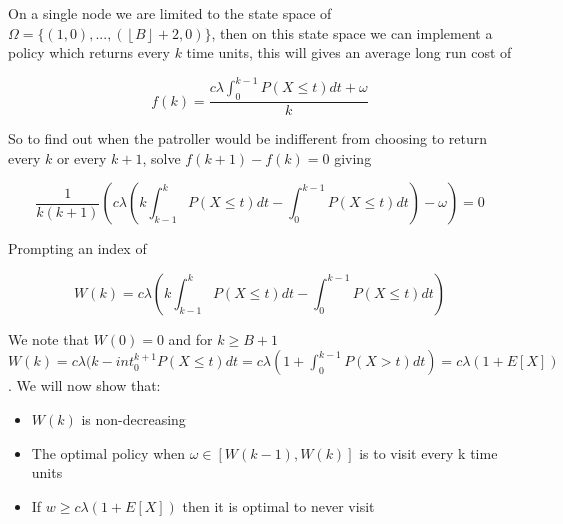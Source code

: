 \documentclass[a4paper,10pt]{article}
\newcommand{\floor}[1]{\left \lfloor #1 \right \rfloor}
\theoremstyle{definition}
\theoremstyle{definition}
\theoremstyle{remark}
\theoremstyle{definition}
\begin{document}
On a single node we are limited to the state space of $\Omega=\{ (1,0),...,(\floor{B}+2,0) \}$, then on this state space we can implement a policy which returns every $k$ time units, this will gives an average long run cost of

\begin{equation}
f(k)=\frac{c \lambda \int_{0}^{k-1} P(X \leq t) dt +\omega}{k}
\end{equation}

So to find out when the patroller would be indifferent from choosing to return every $k$ or every $k+1$, solve $f(k+1)-f(k)=0$ giving

$$\frac{1}{k(k+1)}(c \lambda (k \int_{k-1}^{k} P(X \leq t) dt - \int_{0}^{k-1} P(X \leq t) dt ) -\omega)=0 $$

Prompting an index of

$$W(k)=c \lambda (k \int_{k-1}^{k} P(X \leq t) dt - \int_{0}^{k-1} P(X \leq t) dt )$$

We note that $W(0)=0$ and for $k \geq B+1$ $W(k)=c \lambda (k - int_{0}^{k+1} P(X \leq t)dt=c \lambda (1+\int_{0}^{k-1} P(X > t)dt)=c \lambda (1+ E[X])$. We will now show that:
\begin{itemize}
\item $W(k)$ is non-decreasing
\item The optimal policy when $\omega \in [W(k-1),W(k)]$ is to visit every k time units
\item If $w \geq c \lambda (1+E[X])$ then it is optimal to never visit
\end{itemize}
\end{document}
